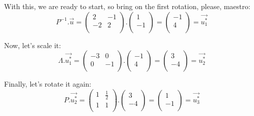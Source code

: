 \documentclass[a4,12pt,twosided,openany]{memoir}
\begin{document}
\par 
\indent
With this, we are ready to start, so bring on the first rotation, please, maestro:
\[ P^{-1}.\overrightarrow{u} = \begin{pmatrix}
2 & -1 \\
-2 & 2 \\
\end{pmatrix}. \begin{pmatrix}
 1 \\
 -1 \\
\end{pmatrix} = \begin{pmatrix}
 -1 \\
 4 \\
\end{pmatrix} = \overrightarrow{u_1^*}\]
\par 
\indent
Now, let’s scale it:
\[ \Lambda.\overrightarrow{u_1^*} = \begin{pmatrix}
-3 & 0 \\
0 & -1 \\
\end{pmatrix}.\begin{pmatrix}
 -1 \\
 4 \\
\end{pmatrix} = \begin{pmatrix}
 3 \\
 -4 \\
\end{pmatrix} = \overrightarrow{u_2^*}\]
\par 
\indent
Finally, let’s rotate it again:
\[ P.\overrightarrow{u_2^*} = \begin{pmatrix}
1 & \frac{1}{2} \\
1 & 1 \\
\end{pmatrix}.\begin{pmatrix}
 3 \\
 -4 \\
\end{pmatrix} = \begin{pmatrix}
 1 \\
 -1 \\
\end{pmatrix} = \overrightarrow{u_3^*}\]
\end{document}
